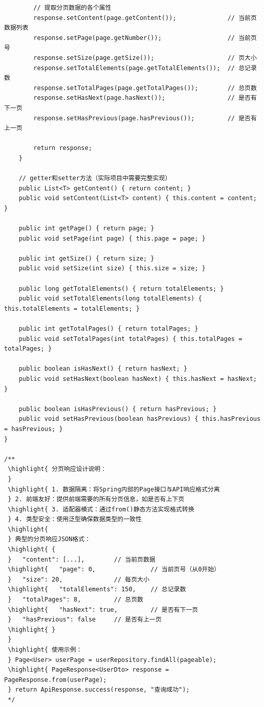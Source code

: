 \begin{lstlisting}
        // 提取分页数据的各个属性
        response.setContent(page.getContent());              // 当前页数据列表
        response.setPage(page.getNumber());                  // 当前页号
        response.setSize(page.getSize());                    // 页大小
        response.setTotalElements(page.getTotalElements());  // 总记录数
        response.setTotalPages(page.getTotalPages());        // 总页数
        response.setHasNext(page.hasNext());                 // 是否有下一页
        response.setHasPrevious(page.hasPrevious());         // 是否有上一页
        
        return response;
    }
    
    // getter和setter方法（实际项目中需要完整实现）
    public List<T> getContent() { return content; }
    public void setContent(List<T> content) { this.content = content; }
    
    public int getPage() { return page; }
    public void setPage(int page) { this.page = page; }
    
    public int getSize() { return size; }
    public void setSize(int size) { this.size = size; }
    
    public long getTotalElements() { return totalElements; }
    public void setTotalElements(long totalElements) { this.totalElements = totalElements; }
    
    public int getTotalPages() { return totalPages; }
    public void setTotalPages(int totalPages) { this.totalPages = totalPages; }
    
    public boolean isHasNext() { return hasNext; }
    public void setHasNext(boolean hasNext) { this.hasNext = hasNext; }
    
    public boolean isHasPrevious() { return hasPrevious; }
    public void setHasPrevious(boolean hasPrevious) { this.hasPrevious = hasPrevious; }
}

/**
 \highlight{ 分页响应设计说明：
 } 
 \highlight{ 1. 数据隔离：将Spring内部的Page接口与API响应格式分离
 } 2. 前端友好：提供前端需要的所有分页信息，如是否有上下页
 \highlight{ 3. 适配器模式：通过from()静态方法实现格式转换
 } 4. 类型安全：使用泛型确保数据类型的一致性
 \highlight{ 
 } 典型的分页响应JSON格式：
 \highlight{ {
 }   "content": [...],        // 当前页数据
 \highlight{   "page": 0,               // 当前页号（从0开始）
 }   "size": 20,              // 每页大小
 \highlight{   "totalElements": 150,    // 总记录数
 }   "totalPages": 8,         // 总页数
 \highlight{   "hasNext": true,         // 是否有下一页
 }   "hasPrevious": false     // 是否有上一页
 \highlight{ }
 } 
 \highlight{ 使用示例：
 } Page<User> userPage = userRepository.findAll(pageable);
 \highlight{ PageResponse<UserDto> response = PageResponse.from(userPage);
 } return ApiResponse.success(response, "查询成功");
 */
\end{lstlisting}

